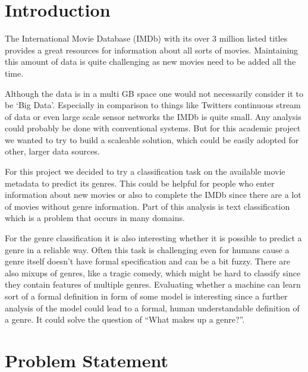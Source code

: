 \documentclass{vldb}
\begin{document}
\section{Introduction}

\par The International Movie Database (IMDb) with its over 3 million listed titles provides a great resources for information about all sorts of movies. Maintaining this amount of data is quite challenging as new movies need to be added all the time.
\par Although the data is in a multi GB space one would not necessarily consider it to be ‘Big Data’. Especially in comparison to things like Twitters continuous stream of data or even large scale sensor networks the IMDb is quite small. Any analysis could probably be done with conventional systems. But for this academic project we wanted to try to build a scaleable solution, which could be easily adopted for other, larger data sources.

\par For this project we decided to try a classification task on the available movie metadata to predict its genres. This could be helpful for people who enter information about new movies or also to complete the IMDb since there are a lot of movies without genre information.
Part of this analysis is text classification which is a problem that occurs in many domains.

\par For the genre classification it is also interesting whether it is possible to predict a genre in a reliable way. Often this task is challenging even for humans cause a genre itself doesn’t have formal specification and can be a bit fuzzy. There are also mixups of genres, like a tragic comedy, which might be hard to classify since they contain features of multiple genres. Evaluating whether a machine can learn sort of a formal definition in form of some model is interesting since a further analysis of the model could lead to a formal, human understandable definition of a genre. It could solve the question of “What makes up a genre?”.



\section{Problem Statement}
\end{document}
